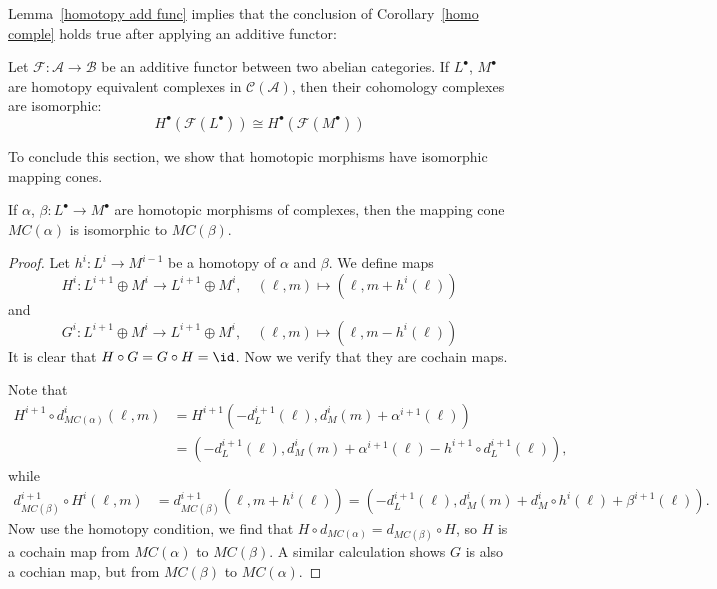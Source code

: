 Lemma~\ref{homotopy add func} implies that the conclusion of Corollary~\ref{homo comple} holds true after applying an additive functor:
\begin{theorem}\label{homotopy equ add}
Let $\mathscr{F}:\mathcal{A}\to\mathcal{B}$ be an additive functor between two abelian categories. If $L^\bullet$, $M^\bullet$ are homotopy equivalent complexes in 
$\mathcal{C}(\mathcal{A})$, then their cohomology complexes are isomorphic:
\[H^\bullet(\mathscr{F}(L^\bullet))\cong H^\bullet(\mathscr{F}(M^\bullet))\]
\end{theorem}
To conclude this section, we show that homotopic morphisms have isomorphic mapping cones.
\begin{proposition}\label{homotopic morphism iso mapping cone}
If $\alpha$, $\beta:L^\bullet\to M^\bullet$ are homotopic morphisms of complexes, then the mapping cone $MC(\alpha)$ is isomorphic to $MC(\beta)$.
\end{proposition}
\begin{proof}
Let $h^i:L^i\to M^{i-1}$ be a homotopy of $\alpha$ and $\beta$. We define maps
\[H^i:L^{i+1}\oplus M^i\to L^{i+1}\oplus M^{i},\quad (\ell,m)\mapsto(\ell,m+h^i(\ell))\]
and
\[G^i:L^{i+1}\oplus M^i\to L^{i+1}\oplus M^{i},\quad (\ell,m)\mapsto(\ell,m-h^i(\ell))\]
It is clear that $H\circ G=G\circ H=\id$. Now we verify that they are cochain maps.\par
Note that
\begin{align*}
H^{i+1}\circ d^i_{MC(\alpha)}(\ell,m)&=H^{i+1}(-d^{i+1}_L(\ell),d^i_M(m)+\alpha^{i+1}(\ell))\\
&=(-d^{i+1}_L(\ell),d^i_M(m)+\alpha^{i+1}(\ell)-h^{i+1}\circ d^{i+1}_L(\ell)),
\end{align*}
while
\begin{align*}
d^{i+1}_{MC(\beta)}\circ H^i(\ell,m)&=d^{i+1}_{MC(\beta)}(\ell,m+h^i(\ell))=(-d_L^{i+1}(\ell),d^i_M(m)+d^i_M\circ h^i(\ell)+\beta^{i+1}(\ell)).
\end{align*}
Now use the homotopy condition, we find that $H\circ d_{MC(\alpha)}=d_{MC(\beta)}\circ H$, so $H$ is a cochain map from $MC(\alpha)$ to $MC(\beta)$. A similar 
calculation shows $G$ is also a cochian map, but from $MC(\beta)$ to $MC(\alpha)$.
\end{proof}
